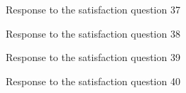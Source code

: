 \documentclass[12pt,oneside,openright,a4paper]{cpe-english-project}
\begin{document}
\begin{figure}[!h]\centering {} \caption{Response to the satisfaction question 37} \end{figure}
\begin{figure}[!h]\centering {} \caption{Response to the satisfaction question 38} \end{figure}
\begin{figure}[!h]\centering {} \caption{Response to the satisfaction question 39} \end{figure}
\begin{figure}[!h]\centering {} \caption{Response to the satisfaction question 40} \end{figure}
\end{document}
